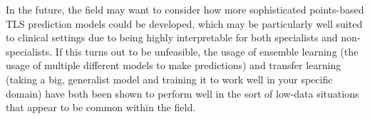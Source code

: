 \documentclass{article}
\begin{document}
In the future, the field may want to consider how more sophisticated points-based TLS prediction models could be developed, which may be particularly well suited to clinical settings due to being highly interpretable for both specialists and non-specialists. If this turns out to be unfeasible, the usage of ensemble learning (the usage of multiple different models to make predictions) and transfer learning (taking a big, generalist model and training it to work well in your specific domain) have both been shown to perform well in the sort of low-data situations that appear to be common within the field.


\newpage
      

\end{document}
